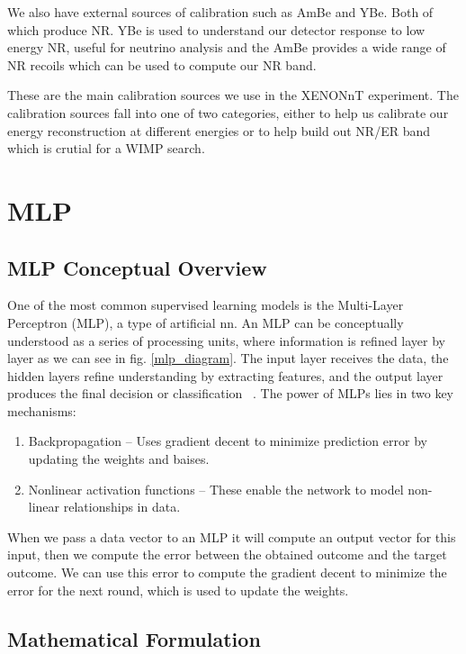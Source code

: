 \documentclass[12pt]{article}
\begin{document}
We also have external sources of calibration such as AmBe and YBe. Both of which produce NR. YBe is used to understand our detector response to low energy NR, useful for neutrino analysis and the AmBe provides a wide range of NR recoils which can be used to compute our NR band.

These are the main calibration sources we use in the XENONnT experiment. The calibration sources fall into one of two categories, either to help us calibrate our energy reconstruction at different energies or to help build out NR/ER band which is crutial for a WIMP search.

\section{MLP}
\label{mlp}

\subsection{MLP Conceptual Overview}

One of the most common supervised learning models is the Multi-Layer Perceptron (MLP), a type of artificial \acrfull{nn}. An MLP can be conceptually understood as a series of processing units, where information is refined layer by layer as we can see in fig. \ref{mlp_diagram}. The input layer receives the data, the hidden layers refine understanding by extracting features, and the output layer produces the final decision or classification ~\cite{Werbos1974BeyondRegression, Rumelhart1986Backprop}.
The power of MLPs lies in two key mechanisms:
\begin{enumerate}
    \item Backpropagation – Uses gradient decent to minimize prediction error by updating the weights and baises.
    \item Nonlinear activation functions – These enable the network to model non-linear relationships in data.
\end{enumerate}

When we pass a data vector to an MLP it will compute an output vector for this input, then we compute the error between the obtained outcome and the target outcome. We can use this error to compute the gradient decent to minimize the error for the next round, which is used to update the weights.

\subsection{Mathematical Formulation}
\end{document}
